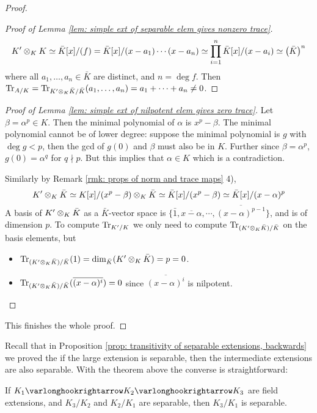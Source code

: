 \documentclass{article}
\begin{document}
\begin{proof}
\begin{proof}[Proof of Lemma \ref{lem: simple ext of separable elem gives nonzero trace}]
        \[
            K' \otimes_K K\simeq \bar{K}[x]/(f) = \bar{K}[x]/(x - a_1) \cdots (x - a_n) \simeq \prod_{i = 1}^{n}\bar{K}[x]/(x - a_i) \simeq \left( \bar{K} \right)^n
        \]
        where all $a_1, \dots, a_n \in \bar{K}$ are distinct, and $n = \deg f$. Then $\operatorname{Tr}_{A/K} = \operatorname{Tr}_{K' \otimes_K \bar{K}/\bar{K}}(a_1, \dots, a_n) = a_1 + \cdots + a_n \neq 0$.
    \end{proof}
    \begin{proof}[Proof of Lemma \ref{lem: simple ext of nilpotent elem gives zero trace}]
        Let $\beta = \alpha^p \in K$. Then the minimal polynomial of $\alpha$ is $x^p - \beta$. The minimal polynomial cannot be of lower degree: suppose the minimal polynomial is $g$ with $\deg g < p$, then the gcd of $g(0)$ and $\beta$ must also be in $K$. Further since $\beta = \alpha^p$, $g(0) = \alpha^q$ for $q \nmid p$. But this implies that $\alpha \in K$ which is a contradiction.

        Similarly by Remark \ref{rmk: props of norm and trace maps} 4),
        \[
            K' \otimes_K \bar{K} \simeq K[x]/(x^p - \beta) \otimes_K \bar{K} \simeq \bar{K}[x]/(x^p - \beta) \simeq \bar{K}[x]/(x - \alpha)^p
        \]
        A basis of $K' \otimes_K \bar{K}$ as a $\bar{K}$-vector space is $\{\bar{1}, \overline{x - \alpha}, \cdots, \overline{(x - \alpha)^{p-1}}\}$, and is of dimension $p$. To compute $\operatorname{Tr}_{K'/K}$ we only need to compute $\operatorname{Tr}_{(K' \otimes_K \bar{K})/\bar{K}}$ on the basis elements, but
        \begin{itemize}
            \item $\operatorname{Tr}_{(K' \otimes_K \bar{K})/\bar{K}}(1) = \dim_{\bar{K}} (K' \otimes_K \bar{K}) = p = 0$.
            \item $\operatorname{Tr}_{(K' \otimes_K \bar{K})/\bar{K}}(\overline{(x - \alpha)^i}) = 0$ since $\overline{(x - \alpha)^i}$ is nilpotent. 
        \end{itemize}
    \end{proof}
    This finishes the whole proof.
\end{proof}

Recall that in Proposition \ref{prop: transitivity of separable extensions, backwards} we proved the if the large extension is separable, then the intermediate extensions are also separable. With the theorem above the converse is straightforward:

\begin{corollary}\label{prop: transitivity of separable extensions, forwards}
    If $K_1 \ext K_2 \ext K_3$ are field extensions, and $K_3/K_2$ and $K_2/K_1$ are separable, then $K_3/K_1$ is separable. 
\end{corollary}
\end{document}
